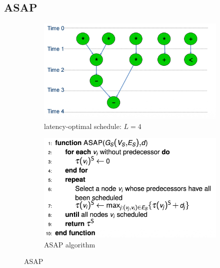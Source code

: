 \subsection{ASAP}
\begin{figure}[h]
	\begin{center}
	\begin{subfigure}[b]{0.45\textwidth}
		\includegraphics[width=\textwidth]{images/ASAP_graph.png}
		\caption{latency-optimal schedule: $L = 4$}
		\label{fig:ASAP_graph}
	\end{subfigure}
	\hfill
	\begin{subfigure}[b]{0.45\textwidth}
		\includegraphics[width=\textwidth]{images/ASAP.png}
		\caption{ASAP algorithm}
		\label{fig:ASAP_algo}
	\end{subfigure}
	\caption{ASAP}
	\end{center}
\end{figure}

